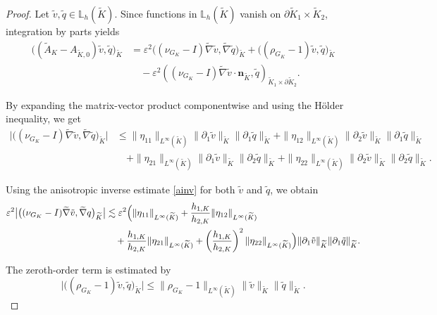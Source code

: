 \documentclass[a4paper,twoside,10pt]{article}
\newcommand{\AKO}{{A_{\tilde K,0}}}
\newcommand{\eps}{\varepsilon}
\newcommand{\bn}{\mathbf{n}}
\numberwithin{equation}{section}
\newcommand{\Kt}{\widetilde{K}}
\newcommand{\hKot}{h_{1,K}}
\newcommand{\hKtt}{h_{2,K}}
\begin{document}
	\begin{proof}
	Let $\tilde v,\tilde q\in \mathbb L_h(\Kt)$. 
Since functions in $\mathbb L_h(\Kt)$ vanish on
	$\partial\Kt_1\times \Kt_2$, integration by parts yields
	\begin{align*}
	\bigl((\widetilde A_K-\AKO)\tilde v,\tilde q\bigr)_{\Kt}
	&=
	\eps^2\bigl((\nu_{G_K}-I)\widetilde\nabla \tilde v,\widetilde\nabla \tilde q\bigr)_{\Kt}
	+\bigl((\rho_{G_K}-1)\tilde v,\tilde q\bigr)_{\Kt}
	\\
	&\quad
	-\eps^2 ( (\nu_{G_K}-I)\widetilde\nabla \tilde v\cdot \bn_{\Kt}, \tilde q)_{\Kt_1\times \partial\Kt_2}.
	\nonumber
	\end{align*}
	
	By expanding the matrix-vector product componentwise and using the H\"older inequality, we get
	\begin{align*}
	\bigl|\big((\nu_{G_K}-I)\widetilde\nabla \tilde v,\widetilde\nabla \tilde q\big)_{\Kt}\bigr|
	&\le
	\|\eta_{11}\|_{L^\infty(\Kt)}
	\|\partial_1\tilde v\|_{\Kt}
	\|\partial_1 \tilde q\|_{\Kt}
	+
	\|\eta_{12}\|_{L^\infty(\Kt)}
	\|\partial_2\tilde v\|_{\Kt}
	\|\partial_1 \tilde q\|_{\Kt}
	\\
	&\quad +
	\|\eta_{21}\|_{L^\infty(\Kt)}
	\|\partial_1\tilde v\|_{\Kt}
	\|\partial_2 \tilde q\|_{\Kt}
	+
	\|\eta_{22}\|_{L^\infty(\Kt)}
	\|\partial_2\tilde v\|_{\Kt}
	\|\partial_2 \tilde q\|_{\Kt}.
	\end{align*}
	
    Using the anisotropic inverse estimate \eqref{ainv} for both $\tilde v$ and $\tilde q$, we obtain
	\begin{align}
	\label{eq:interior-aniso}
	\eps^2\bigl|\big((\nu_{G_K}-I)\widetilde\nabla \tilde v,\widetilde\nabla q\big)_{\Kt}\bigr|
	&\lesssim
	\eps^2
	\Bigl(
	\|\eta_{11}\|_{L^\infty(\Kt)}
	+\frac{\hKot}{\hKtt}\|\eta_{12}\|_{L^\infty(\Kt)}\\
	&
	\quad +\frac{\hKot}{\hKtt}\|\eta_{21}\|_{L^\infty(\Kt)}
	+\left(\frac{\hKot}{\hKtt}\right)^2\|\eta_{22}\|_{L^\infty(\Kt)}
	\Bigr)
	\|\partial_1\tilde v\|_{\Kt}
	\|\partial_1 \tilde q\|_{\Kt}.
	\nonumber
	\end{align}
	
	The zeroth-order term is estimated 
	by
	\begin{equation}\label{eq:rho-aniso}
	\bigl|\big((\rho_{G_K}-1)\tilde v, \tilde q\big)_{\Kt}\bigr|
	\le
	\|\rho_{G_K}-1\|_{L^\infty(\Kt)}
	\|\tilde v\|_{\Kt}
	\|\tilde q\|_{\Kt}.
	\end{equation}
	

\end{proof}
\end{document}
